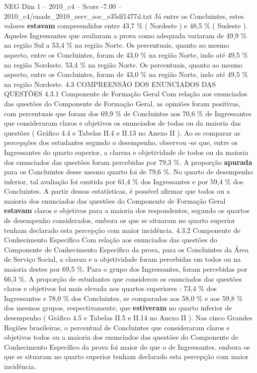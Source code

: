 \begin{textsample}{NEG Dim 1 – 2010\_c4 – Score -7.00 – 2010\_c4/enade\_2010\_serv\_soc\_e35df1477d.txt}
Já entre os Concluintes, estes valores \textbf{estavam} compreendidos entre 43,7 \% ( Nordeste ) e 48,5 \% ( Sudeste ).
Aqueles Ingressantes que avaliaram a prova como adequada variaram de 49,9 \% na região Sul a 53,4 \% na região Norte.
Os percentuais, quanto ao mesmo aspecto, entre os Concluintes, foram de 43,0 \% na região Norte, indo até 49,5 \% na região Nordeste. 53,4 \% na região Norte.
Os percentuais, quanto ao mesmo aspecto, entre os Concluintes, foram de 43,0 \% na região Norte, indo até 49,5 \% na região Nordeste. 4.3 COMPREENSÃO DOS ENUNCIADOS DAS QUESTÕES 4.3.1 Componente de Formação Geral Com relação aos enunciados das questões do Componente de Formação Geral, as opiniões foram positivas, com percentuais que foram dos 69,9 \% de Concluintes aos 70,6 \% de Ingressantes que consideraram claros e objetivos os enunciados de todas ou da maioria das questões ( Gráfico 4.4 e Tabelas II.4 e II.13 no Anexo II ).
Ao se comparar as percepções dos estudantes segundo o desempenho, observou -se que, entre os Ingressantes do quarto superior, a clareza e objetividade de todos ou da maioria dos enunciados das questões foram percebidas por 79,3 \%.
A proporção \textbf{apurada} para os Concluintes desse mesmo quarto foi de 79,6 \%.
No quarto de desempenho inferior, tal avaliação foi emitida por 61,4 \% dos Ingressantes e por 59,4 \% dos Concluintes.
A partir dessas estatísticas, é possível afirmar que todos ou a maioria dos enunciados das questões do Componente de Formação Geral \textbf{estavam} claros e objetivos para a maioria dos respondentes, segundo os quartos de desempenho considerados, embora os que se situaram no quarto superior tenham declarado esta percepção com maior incidência. 4.3.2 Componente de Conhecimento Específico Com relação aos enunciados das questões do Componente de Conhecimento Específico da prova, para os Concluintes da Área de Serviço Social, a clareza e a objetividade foram percebidas em todos ou na maioria destes por 69,5 \%.
Para o grupo dos Ingressantes, foram percebidas por 66,3 \%.
A proporção de estudantes que considerou os enunciados das questões claros e objetivos foi mais elevada nos quartos superiores : 73,4 \% dos Ingressantes e 78,0 \% dos Concluintes, se comparados aos 58,0 \% e aos 59,8 \% dos mesmos grupos, respectivamente, que \textbf{estiveram} no quarto inferior de desempenho ( Gráfico 4.5 e Tabelas II.5 e II.14 no Anexo II ).
Nas cinco Grandes Regiões brasileiras, o percentual de Concluintes que consideraram claros e objetivos todos ou a maioria dos enunciados das questões do Componente de Conhecimento Específico da prova foi maior do que o de Ingressantes. embora os que se situaram no quarto superior tenham declarado esta percepção com maior incidência.

\end{textsample}
